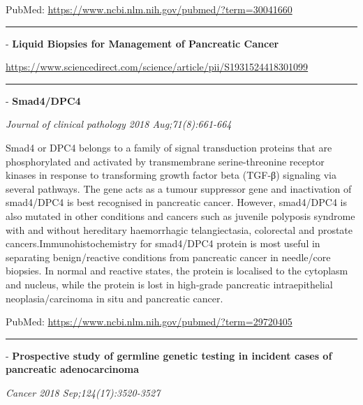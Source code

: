 \documentclass[]{article}
\begin{document}
PubMed: \url{https://www.ncbi.nlm.nih.gov/pubmed/?term=30041660}

{}

{}

\begin{center}\rule{0.5\linewidth}{\linethickness}\end{center}

 - \textbf{Liquid Biopsies for Management of Pancreatic Cancer}

\url{https://www.sciencedirect.com/science/article/pii/S1931524418301099}

\begin{center}\rule{0.5\linewidth}{\linethickness}\end{center}

 - \textbf{Smad4/DPC4}

\emph{Journal of clinical pathology 2018 Aug;71(8):661-664}

Smad4 or DPC4 belongs to a family of signal transduction proteins that
are phosphorylated and activated by transmembrane serine-threonine
receptor kinases in response to transforming growth factor beta (TGF-β)
signaling via several pathways. The gene acts as a tumour suppressor
gene and inactivation of smad4/DPC4 is best recognised in pancreatic
cancer. However, smad4/DPC4 is also mutated in other conditions and
cancers such as juvenile polyposis syndrome with and without hereditary
haemorrhagic telangiectasia, colorectal and prostate
cancers.Immunohistochemistry for smad4/DPC4 protein is most useful in
separating benign/reactive conditions from pancreatic cancer in
needle/core biopsies. In normal and reactive states, the protein is
localised to the cytoplasm and nucleus, while the protein is lost in
high-grade pancreatic intraepithelial neoplasia/carcinoma in situ and
pancreatic cancer.

PubMed: \url{https://www.ncbi.nlm.nih.gov/pubmed/?term=29720405}

{}

{}

\begin{center}\rule{0.5\linewidth}{\linethickness}\end{center}

 - \textbf{Prospective study of germline genetic testing in incident
cases of pancreatic adenocarcinoma}

\emph{Cancer 2018 Sep;124(17):3520-3527}
\end{document}
